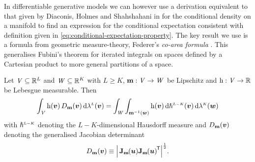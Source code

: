 In differentiable generative models we can however use a derivation equivalent to that given by Diaconis, Holmes and Shahshahani in \citep{diaconis2013sampling} for the conditional density on a manifold to find an expression for the conditional expectation consistent with definition given in \eqref{eq:conditional-expectation-property}. %
The key result we use is a formula from geometric measure-theory, Federer's \emph{co-area formula} \citep[\S 3.2.12]{federer2014geometric}. This generalises Fubini's theorem for iterated integrals on spaces defined by a Cartesian product to more general partitions of a space.%
\begin{theorem}\label{thm:co-area-formula}
Let $\mathit{V} \subseteq \mathbb{R}^L$ and $\mathit{W} \subseteq \mathbb{R}^K$ with $L \geq K$, ${\mathbf{m}}:\mathit{V}\to\mathit{W}$ be Lipschitz and $\mathrm{h} : \mathit{V} \to \mathbb{R}$ be Lebesgue measurable. Then
\begin{equation}\label{eq:co-area-formula}
    \int_{\set{V}} 
      \func{h}(\vct{v}) \, \jacobproddet{\vctfunc{m}}{\vct{v}}
    \,\dr\lebm{L}(\vct{v})
    = 
    \int_{\set{W}}
      \int_{\preimage{\vctfunc{m}}{\vct{w}}} \func{h}(\vct{v}) \,\dr\haum{L-K}(\vct{v})
    \,\dr\lebm{K}(\vct{w})
\end{equation}
with $\haum{L-K}$ denoting the $L-K$-dimensional Hausdorff measure and $\jacobproddet{\vctfunc{m}}{\vct{v}}$ denoting the generalised Jacobian determinant
\begin{equation}\label{eq:jacobian-product-det}
  \jacobproddet{\vctfunc{m}}{\vct{v}} \equiv 
  \left|\,\jacob{\vctfunc{m}}{\vct{u}}\jacob{\vctfunc{m}}{\vct{u}}\tr\right|^{\frac{1}{2}}.
\end{equation}
\end{theorem}
